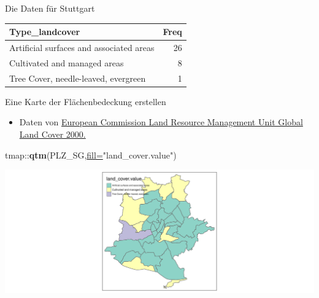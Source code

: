 \documentclass[ignorenonframetext,]{beamer}
\newenvironment{Shaded}{\begin{snugshade}}{\end{snugshade}}
\newcommand{\DataTypeTok}[1]{\textcolor[rgb]{0.74,0.68,0.62}{\underline{#1}}}
\newcommand{\KeywordTok}[1]{\textcolor[rgb]{0.26,0.66,0.93}{\textbf{#1}}}
\newcommand{\NormalTok}[1]{\textcolor[rgb]{0.74,0.68,0.62}{#1}}
\newcommand{\OperatorTok}[1]{\textcolor[rgb]{0.74,0.68,0.62}{#1}}
\newcommand{\StringTok}[1]{\textcolor[rgb]{0.02,0.61,0.04}{#1}}
\providecommand{\tightlist}{%
  \setlength{\itemsep}{0pt}\setlength{\parskip}{0pt}}
\begin{document}
\begin{frame}{Die Daten für Stuttgart}
\protect\hypertarget{die-daten-fur-stuttgart}{}

\begin{longtable}[]{@{}lr@{}}
\toprule
Type\_landcover & Freq\tabularnewline
\midrule
\endhead
Artificial surfaces and associated areas & 26\tabularnewline
Cultivated and managed areas & 8\tabularnewline
Tree Cover, needle-leaved, evergreen & 1\tabularnewline
\bottomrule
\end{longtable}

\end{frame}

\begin{frame}[fragile]{Eine Karte der Flächenbedeckung erstellen}
\protect\hypertarget{eine-karte-der-flachenbedeckung-erstellen}{}

\begin{itemize}
\tightlist
\item
  Daten von
  \href{http://bioval.jrc.ec.europa.eu/products/glc2000/products.php}{European
  Commission Land Resource Management Unit Global Land Cover 2000.}
\end{itemize}

\begin{Shaded}
\begin{Highlighting}[]
\NormalTok{tmap}\OperatorTok{::}\KeywordTok{qtm}\NormalTok{(PLZ_SG,}\DataTypeTok{fill=}\StringTok{"land_cover.value"}\NormalTok{)}
\end{Highlighting}
\end{Shaded}

\includegraphics{B4_Overpass_files/figure-beamer/unnamed-chunk-27-1.pdf}

\end{frame}
\end{document}
